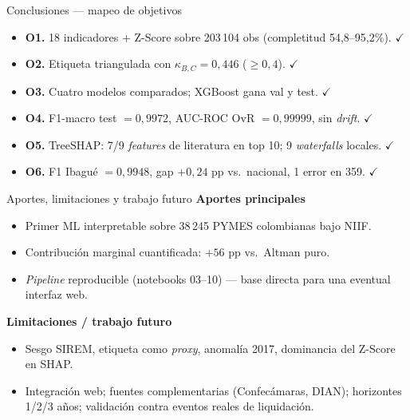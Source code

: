 \documentclass[10pt, aspectratio=169, xcolor=dvipsnames]{beamer}
\newcommand{\zaltscore}{Z\textquotesingle\textquotesingle-Score}
\begin{document}
\begin{frame}{Conclusiones --- mapeo de objetivos}
\begin{itemize}
  \item \textbf{O1.} 18 indicadores + \zaltscore{} sobre 203\,104 obs (completitud 54,8--95,2\%). $\checkmark$
  \item \textbf{O2.} Etiqueta triangulada con $\kappa_{B,C}=0{,}446$ ($\geq 0{,}4$). $\checkmark$
  \item \textbf{O3.} Cuatro modelos comparados; XGBoost gana val y test. $\checkmark$
  \item \textbf{O4.} F1-macro test $= 0{,}9972$, AUC-ROC OvR $= 0{,}99999$, sin \emph{drift}. $\checkmark$
  \item \textbf{O5.} TreeSHAP: 7/9 \emph{features} de literatura en top 10; 9 \emph{waterfalls} locales. $\checkmark$
  \item \textbf{O6.} F1 Ibagu\'e $= 0{,}9948$, gap $+0{,}24$ pp vs.\ nacional, 1 error en 359. $\checkmark$
\end{itemize}
\end{frame}

\begin{frame}{Aportes, limitaciones y trabajo futuro}
\textbf{Aportes principales}
\begin{itemize}
  \item Primer ML interpretable sobre 38\,245 PYMES colombianas bajo NIIF.
  \item Contribuci\'on marginal cuantificada: $+56$ pp vs.\ Altman puro.
  \item \emph{Pipeline} reproducible (notebooks 03--10) --- base directa para una eventual interfaz web.
\end{itemize}
\textbf{Limitaciones / trabajo futuro}
\begin{itemize}
  \item Sesgo SIREM, etiqueta como \emph{proxy}, anomal\'ia 2017, dominancia del \zaltscore{} en SHAP.
  \item Integraci\'on web; fuentes complementarias (Confec\'amaras, DIAN); horizontes 1/2/3 a\~nos; validaci\'on contra eventos reales de liquidaci\'on.
\end{itemize}
\end{frame}
\end{document}
